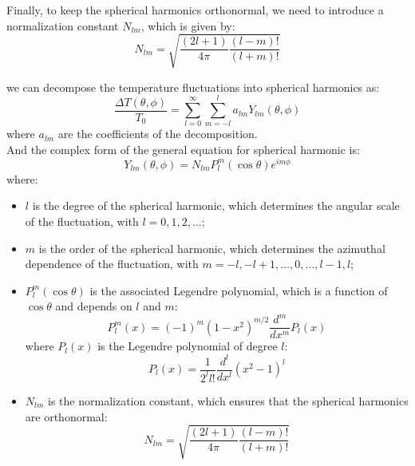 \begin{foundation}
    Finally, to keep the spherical harmonics orthonormal, we need to introduce a normalization constant $N_{lm}$, which is given by:
    \[
        N_{lm} = \sqrt{\frac{(2l + 1)}{4\pi} \frac{(l - m)!}{(l + m)!}}
    \]
\end{foundation}

\begin{theory}
    we can decompose the temperature fluctuations into spherical harmonics as:
    \[
        \frac{\Delta T(\theta, \phi)}{T_0} = \sum_{l=0}^{\infty} \sum_{m=-l}^{l} a_{lm} Y_{lm}(\theta, \phi)
    \] 
    where $a_{lm}$ are the coefficients of the decomposition. \\

    And the complex form of the general equation for spherical harmonic is:
    \[
        Y_{lm}(\theta, \phi) = N_{lm} P_l^m(\cos \theta) e^{i m \phi}
    \]
    where:
    \begin{itemize}
        \item $l$ is the degree of the spherical harmonic, which determines the angular scale of the fluctuation, with $l = 0, 1, 2, \dots$;
        \item $m$ is the order of the spherical harmonic, which determines the azimuthal dependence of the fluctuation, with $m = -l, -l + 1, \dots, 0, \dots, l - 1, l$;
        \item $P_l^m(\cos \theta)$ is the associated Legendre polynomial, which is a function of $\cos \theta$ and depends on $l$ and $m$:
        \[
            P_l^m(x) = (-1)^m (1 - x^2)^{m/2} \frac{d^m}{dx^m} P_l(x)
        \]
        where $P_l(x)$ is the Legendre polynomial of degree $l$:
        \[
            P_l(x) = \frac{1}{2^l l!} \frac{d^l}{dx^l} (x^2 - 1)^l
        \]
        \item $N_{lm}$ is the normalization constant, which ensures that the spherical harmonics are orthonormal:
        \[
            N_{lm} = \sqrt{\frac{(2l + 1)}{4\pi} \frac{(l - m)!}{(l + m)!}}
        \]
    \end{itemize}
\end{theory}

